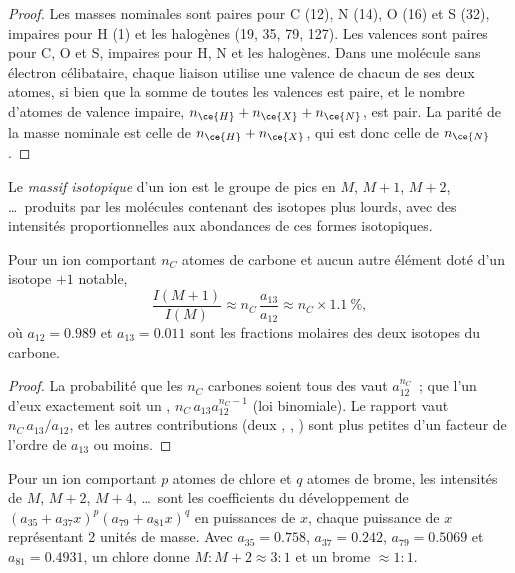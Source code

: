 \begin{proof}
Les masses nominales sont paires pour C (12), N (14), O (16) et S (32), impaires pour H (1) et les
halogènes (19, 35, 79, 127). Les valences sont paires pour C, O et S, impaires pour H, N et les
halogènes. Dans une molécule sans électron célibataire, chaque liaison utilise une valence de chacun de
ses deux atomes, si bien que la somme de toutes les valences est paire, et le nombre d'atomes de valence
impaire, $n_{\ce{H}} + n_{\ce{X}} + n_{\ce{N}}$, est pair. La parité de la masse nominale est celle de
$n_{\ce{H}} + n_{\ce{X}}$, qui est donc celle de
$n_{\ce{N}}$.
\end{proof}

\begin{definition}\label{def:b2:mass-spec-atomic:isotope-pattern}
Le \emph{massif isotopique} d'un ion est le groupe de pics en $M$, $M+1$,
$M+2$, \dots\ produits par les molécules contenant des isotopes plus lourds, avec des intensités
proportionnelles aux abondances de ces formes isotopiques.
\end{definition}

\begin{proposition}[Le pic $M+1$]\label{prop:b2:mass-spec-atomic:m-plus-one}
Pour un ion comportant $n_C$ atomes de carbone et aucun autre élément doté d'un isotope $+1$ notable,
\begin{equation*}
\frac{I(M+1)}{I(M)} \approx n_C\,\frac{a_{13}}{a_{12}} \approx n_C \times 1.1~\%,
\end{equation*}
où $a_{12} = 0.989$ et $a_{13} = 0.011$ sont les fractions molaires des deux isotopes du carbone.
\end{proposition}

\begin{proof}
La probabilité que les $n_C$ carbones soient tous des  vaut $a_{12}^{n_C}$~; que l'un d'eux
exactement soit un , $n_C\,a_{13}a_{12}^{n_C - 1}$ (loi binomiale). Le rapport vaut $n_C\,a_{13}/a_{12}$,
et les autres contributions (deux , , ) sont plus petites d'un facteur de
l'ordre de $a_{13}$ ou moins.
\end{proof}

\begin{proposition}\label{prop:b2:mass-spec-atomic:halogen-patterns}
Pour un ion comportant $p$ atomes de chlore et $q$ atomes de brome, les intensités de $M$, $M+2$, $M+4$,
\dots\ sont les coefficients du développement de $(a_{35} + a_{37}x)^p(a_{79} + a_{81}x)^q$ en puissances
de $x$, chaque puissance de $x$ représentant 2 unités de masse. Avec $a_{35} = 0.758$, $a_{37} = 0.242$,
$a_{79} = 0.5069$ et
$a_{81} = 0.4931$, un chlore donne $M : M+2 \approx 3 : 1$ et un brome $\approx 1 : 1$.
\end{proposition}

